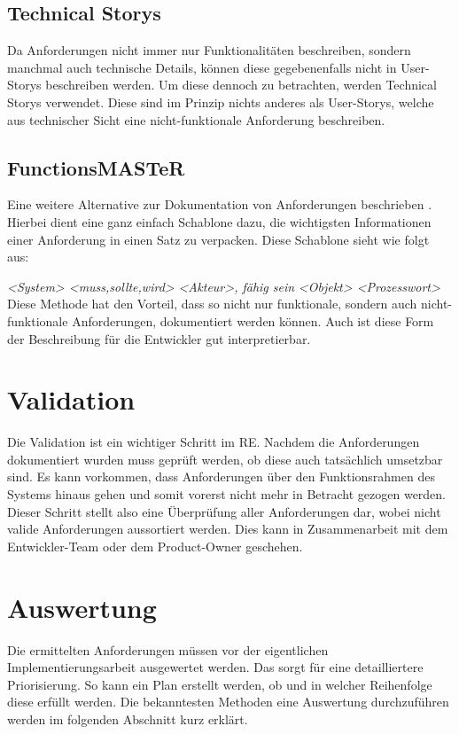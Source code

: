 \subsection{Technical Storys}
Da Anforderungen nicht immer nur Funktionalitäten beschreiben, sondern manchmal auch technische Details, können diese gegebenenfalls nicht in User-Storys beschreiben werden. Um diese dennoch zu betrachten, werden Technical Storys verwendet. Diese sind im Prinzip nichts anderes als User-Storys, welche aus technischer Sicht eine nicht-funktionale Anforderung beschreiben.

\subsection{FunctionsMASTeR}
\label{subsec:functionmaster}
Eine weitere Alternative zur Dokumentation von Anforderungen beschrieben \cite{SOPHIST2}. Hierbei dient eine ganz einfach Schablone dazu, die wichtigsten Informationen einer Anforderung in einen Satz zu verpacken. Diese Schablone sieht wie folgt aus:

\textit{<System> <muss,sollte,wird>} \textit{<Akteur>, fähig sein} \textit{<Objekt> <Prozesswort>}\\

Diese Methode hat den Vorteil, dass so nicht nur funktionale, sondern auch nicht-funktionale Anforderungen, dokumentiert werden können. Auch ist diese Form der Beschreibung für die Entwickler gut interpretierbar.

\section{Validation}
Die Validation ist ein wichtiger Schritt im \acl{RE}. Nachdem die Anforderungen dokumentiert wurden muss geprüft werden, ob diese auch tatsächlich umsetzbar sind. Es kann vorkommen, dass Anforderungen über den Funktionsrahmen des Systems hinaus gehen und somit vorerst nicht mehr in Betracht gezogen werden. Dieser Schritt stellt also eine Überprüfung aller Anforderungen dar, wobei nicht valide Anforderungen aussortiert werden. Dies kann in Zusammenarbeit mit dem Entwickler-Team oder dem Product-Owner geschehen.  

\section{Auswertung}
Die ermittelten Anforderungen müssen vor der eigentlichen Implementierungsarbeit ausgewertet werden. Das sorgt für eine detailliertere Priorisierung. So kann ein Plan erstellt werden, ob und in welcher Reihenfolge diese erfüllt werden. Die bekanntesten Methoden eine Auswertung durchzuführen werden im folgenden Abschnitt kurz erklärt.

